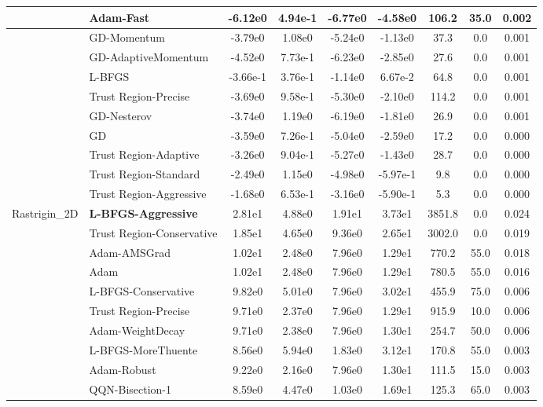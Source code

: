 \documentclass[10pt]{article}
\begin{document}
\begin{longtable}{|l|l|c|c|c|c|c|c|c|}
\hline
 & Adam-Fast & -6.12e0 & 4.94e-1 & -6.77e0 & -4.58e0 & 106.2 & 35.0 & 0.002 \\
\hline
 & GD-Momentum & -3.79e0 & 1.08e0 & -5.24e0 & -1.13e0 & 37.3 & 0.0 & 0.001 \\
\hline
 & GD-AdaptiveMomentum & -4.52e0 & 7.73e-1 & -6.23e0 & -2.85e0 & 27.6 & 0.0 & 0.001 \\
\hline
 & L-BFGS & -3.66e-1 & 3.76e-1 & -1.14e0 & 6.67e-2 & 64.8 & 0.0 & 0.001 \\
\hline
 & Trust Region-Precise & -3.69e0 & 9.58e-1 & -5.30e0 & -2.10e0 & 114.2 & 0.0 & 0.001 \\
\hline
 & GD-Nesterov & -3.74e0 & 1.19e0 & -6.19e0 & -1.81e0 & 26.9 & 0.0 & 0.001 \\
\hline
 & GD & -3.59e0 & 7.26e-1 & -5.04e0 & -2.59e0 & 17.2 & 0.0 & 0.000 \\
\hline
 & Trust Region-Adaptive & -3.26e0 & 9.04e-1 & -5.27e0 & -1.43e0 & 28.7 & 0.0 & 0.000 \\
\hline
 & Trust Region-Standard & -2.49e0 & 1.15e0 & -4.98e0 & -5.97e-1 & 9.8 & 0.0 & 0.000 \\
\hline
 & Trust Region-Aggressive & -1.68e0 & 6.53e-1 & -3.16e0 & -5.90e-1 & 5.3 & 0.0 & 0.000 \\
Rastrigin\_2D & \textbf{L-BFGS-Aggressive} & 2.81e1 & 4.88e0 & 1.91e1 & 3.73e1 & 3851.8 & 0.0 & 0.024 \\
\hline
 & Trust Region-Conservative & 1.85e1 & 4.65e0 & 9.36e0 & 2.65e1 & 3002.0 & 0.0 & 0.019 \\
\hline
 & Adam-AMSGrad & 1.02e1 & 2.48e0 & 7.96e0 & 1.29e1 & 770.2 & 55.0 & 0.018 \\
\hline
 & Adam & 1.02e1 & 2.48e0 & 7.96e0 & 1.29e1 & 780.5 & 55.0 & 0.016 \\
\hline
 & L-BFGS-Conservative & 9.82e0 & 5.01e0 & 7.96e0 & 3.02e1 & 455.9 & 75.0 & 0.006 \\
\hline
 & Trust Region-Precise & 9.71e0 & 2.37e0 & 7.96e0 & 1.29e1 & 915.9 & 10.0 & 0.006 \\
\hline
 & Adam-WeightDecay & 9.71e0 & 2.38e0 & 7.96e0 & 1.30e1 & 254.7 & 50.0 & 0.006 \\
\hline
 & L-BFGS-MoreThuente & 8.56e0 & 5.94e0 & 1.83e0 & 3.12e1 & 170.8 & 55.0 & 0.003 \\
\hline
 & Adam-Robust & 9.22e0 & 2.16e0 & 7.96e0 & 1.30e1 & 111.5 & 15.0 & 0.003 \\
\hline
 & QQN-Bisection-1 & 8.59e0 & 4.47e0 & 1.03e0 & 1.69e1 & 125.3 & 65.0 & 0.003 \\
\hline

\end{longtable}
\end{document}
